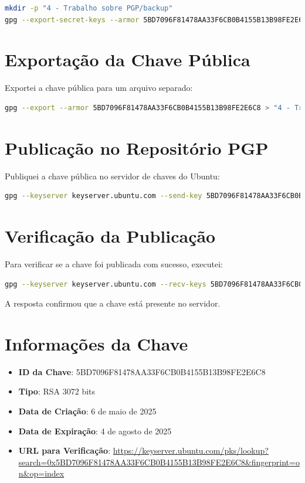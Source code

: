 \begin{lstlisting}[language=bash]
mkdir -p "4 - Trabalho sobre PGP/backup"
gpg --export-secret-keys --armor 5BD7096F81478AA33F6CB0B4155B13B98FE2E6C8 > "4 - Trabalho sobre PGP/backup/private_key_backup.asc"
\end{lstlisting}

\section{Exportação da Chave Pública}
Exportei a chave pública para um arquivo separado:

\begin{lstlisting}[language=bash]
gpg --export --armor 5BD7096F81478AA33F6CB0B4155B13B98FE2E6C8 > "4 - Trabalho sobre PGP/backup/public_key.asc"
\end{lstlisting}

\section{Publicação no Repositório PGP}
Publiquei a chave pública no servidor de chaves do Ubuntu:

\begin{lstlisting}[language=bash]
gpg --keyserver keyserver.ubuntu.com --send-key 5BD7096F81478AA33F6CB0B4155B13B98FE2E6C8
\end{lstlisting}

\section{Verificação da Publicação}
Para verificar se a chave foi publicada com sucesso, executei:

\begin{lstlisting}[language=bash]
gpg --keyserver keyserver.ubuntu.com --recv-keys 5BD7096F81478AA33F6CB0B4155B13B98FE2E6C8
\end{lstlisting}

A resposta confirmou que a chave está presente no servidor.

\section{Informações da Chave}
\begin{itemize}
    \item \textbf{ID da Chave}: 5BD7096F81478AA33F6CB0B4155B13B98FE2E6C8
    \item \textbf{Tipo}: RSA 3072 bits
    \item \textbf{Data de Criação}: 6 de maio de 2025
    \item \textbf{Data de Expiração}: 4 de agosto de 2025
    \item \textbf{URL para Verificação}: \url{https://keyserver.ubuntu.com/pks/lookup?search=0x5BD7096F81478AA33F6CB0B4155B13B98FE2E6C8&fingerprint=on&op=index}
\end{itemize}

